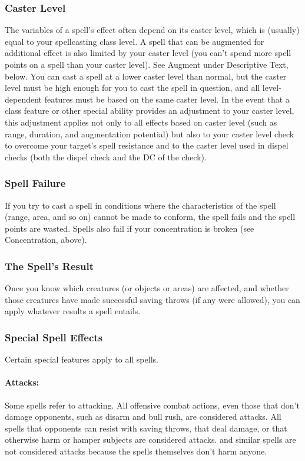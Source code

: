 \subsubsection{Caster Level}
The variables of a spell's effect often depend on its caster level, which is (usually) equal to your spellcasting class level. 
A spell that can be augmented for additional effect is also limited by your caster level (you can't spend more spell points on a spell than your caster level). 
See Augment under Descriptive Text, below.
You can cast a spell at a lower caster level than normal, 
but the caster level must be high enough for you to cast the spell in question, 
and all level-dependent features must be based on the same caster level.
In the event that a class feature or other special ability provides an adjustment to your caster level, 
this adjustment applies not only to all effects based on caster level (such as range, duration, and augmentation potential) 
but also to your caster level check to overcome your target's spell resistance and to the caster level used in dispel checks 
(both the dispel check and the DC of the check).

\subsubsection{Spell Failure}
If you try to cast a spell in conditions where the characteristics of the spell 
(range, area, and so on) cannot be made to conform, the spell fails and the spell points are wasted. 
Spells also fail if your concentration is broken (see Concentration, above).

\subsubsection{The Spell's Result}
Once you know which creatures (or objects or areas) are affected, 
and whether those creatures have made successful saving throws (if any were allowed), you can apply whatever results a spell entails.

\subsubsection{Special Spell Effects}
Certain special features apply to all spells.

\paragraph{Attacks:} Some spells refer to attacking. 
All offensive combat actions, even those that don't damage opponents, 
such as disarm and bull rush, are considered attacks. 
All spells that opponents can resist with saving throws, that deal damage, 
or that otherwise harm or hamper subjects are considered attacks. 
 and similar spells are not considered attacks because the spells themselves don't harm anyone.

